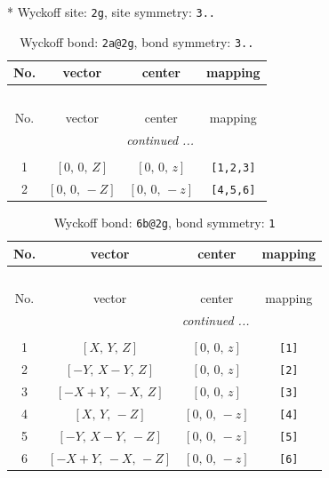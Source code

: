 \documentclass[fleqn,8pt]{jsarticle}
\begin{document}
* Wyckoff site: {\tt 2g}, site symmetry: {\tt 3..}
\renewcommand{\arraystretch}{1.2}
\begin{longtable}{cccc}
\caption{Wyckoff bond: {\tt 2a@2g}, bond symmetry: {\tt 3..}}
 \\
 \hline \hline
No. & vector & center & mapping \\ \hline \endfirsthead

\multicolumn{3}{l}{\tablename\ \thetable{}} \\
 \hline \hline
No. & vector & center & mapping \\ \hline \endhead

 \hline \hline
\multicolumn{3}{r}{\footnotesize\it continued ...} \\ \endfoot

 \hline \hline
\multicolumn{3}{r}{} \\ \endlastfoot

1 & $\left[ 0,\, 0,\, Z \right]$ & $\left[ 0,\, 0,\, z \right]$ & {\tt [1,2,3]} \\ \hline
2 & $\left[ 0,\, 0,\, - Z \right]$ & $\left[ 0,\, 0,\, - z \right]$ & {\tt [4,5,6]} \\
\end{longtable}
\renewcommand{\arraystretch}{1.2}
\begin{longtable}{cccc}
\caption{Wyckoff bond: {\tt 6b@2g}, bond symmetry: {\tt 1}}
 \\
 \hline \hline
No. & vector & center & mapping \\ \hline \endfirsthead

\multicolumn{3}{l}{\tablename\ \thetable{}} \\
 \hline \hline
No. & vector & center & mapping \\ \hline \endhead

 \hline \hline
\multicolumn{3}{r}{\footnotesize\it continued ...} \\ \endfoot

 \hline \hline
\multicolumn{3}{r}{} \\ \endlastfoot

1 & $\left[ X,\, Y,\, Z \right]$ & $\left[ 0,\, 0,\, z \right]$ & {\tt [1]} \\ \hline
2 & $\left[ - Y,\, X - Y,\, Z \right]$ & $\left[ 0,\, 0,\, z \right]$ & {\tt [2]} \\ \hline
3 & $\left[ - X + Y,\, - X,\, Z \right]$ & $\left[ 0,\, 0,\, z \right]$ & {\tt [3]} \\ \hline
4 & $\left[ X,\, Y,\, - Z \right]$ & $\left[ 0,\, 0,\, - z \right]$ & {\tt [4]} \\ \hline
5 & $\left[ - Y,\, X - Y,\, - Z \right]$ & $\left[ 0,\, 0,\, - z \right]$ & {\tt [5]} \\ \hline
6 & $\left[ - X + Y,\, - X,\, - Z \right]$ & $\left[ 0,\, 0,\, - z \right]$ & {\tt [6]} \\
\end{longtable}
\end{document}
